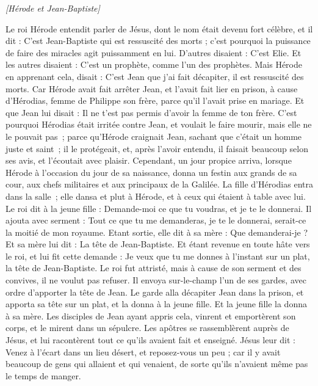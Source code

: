 \begin{multicols}{2}
\begin{center}
\textit{[Hérode et Jean-Baptiste]}
\end{center}
\PPE{}
Le roi Hérode entendit parler de Jésus, dont le nom était devenu fort célèbre, et il dit : C’est Jean-Baptiste qui est ressuscité des morts ; c'est pourquoi la puissance de faire des miracles agit puissamment en lui.
D’autres disaient : C'est Elie. Et les autres disaient : C'est un prophète, comme l’un des prophètes.
Mais Hérode en apprenant cela, disait : C'est Jean que j'ai fait décapiter, il est ressuscité des morts.
Car Hérode avait fait arrêter Jean, et l'avait fait lier en prison, à cause d'Hérodias, femme de Philippe son frère, parce qu'il l'avait prise en mariage.
Et que Jean lui disait : Il ne t'est pas permis d'avoir la femme de ton frère.
C'est pourquoi Hérodias était irritée contre Jean, et voulait le faire mourir, mais elle ne le pouvait pas ;
parce qu’Hérode craignait Jean, sachant que c'était un homme juste et saint ; il le protégeait, et, après l’avoir entendu, il faisait beaucoup selon ses avis, et l’écoutait avec plaisir.
Cependant, un jour propice arriva, lorsque Hérode à l’occasion du jour de sa naissance, donna un festin aux grands de sa cour, aux chefs militaires et aux principaux de la Galilée.
La fille d'Hérodias entra dans la salle ; elle dansa et plut à Hérode, et à ceux qui étaient à table avec lui. Le roi dit à la jeune fille : Demande-moi ce que tu voudras, et je te le donnerai.
Il ajouta avec serment : Tout ce que tu me demanderas, je te le donnerai, serait-ce la moitié de mon royaume.
Etant sortie, elle dit à sa mère : Que demanderai-je ? Et sa mère lui dit : La tête de Jean-Baptiste.
Et étant revenue en toute hâte vers le roi, et lui fit cette demande : Je veux que tu me donnes à l’instant sur un plat, la tête de Jean-Baptiste.
Le roi fut attristé, mais à cause de son serment et des convives, il ne voulut pas refuser.
Il envoya sur-le-champ l’un de ses gardes, avec ordre d'apporter la tête de Jean.
Le garde alla décapiter Jean dans la prison, et apporta sa tête sur un plat, et la donna à la jeune fille. Et la jeune fille la donna à sa mère.
Les disciples de Jean ayant appris cela, vinrent et emportèrent son corps, et le mirent dans un sépulcre.
Les apôtres se rassemblèrent auprès de Jésus, et lui racontèrent tout ce qu'ils avaient fait et enseigné.
Jésus leur dit : Venez à l'écart dans un lieu désert, et reposez-vous un peu ; car il y avait beaucoup de gens qui allaient et qui venaient, de sorte qu'ils n'avaient même pas le temps de manger.

\end{multicols}
